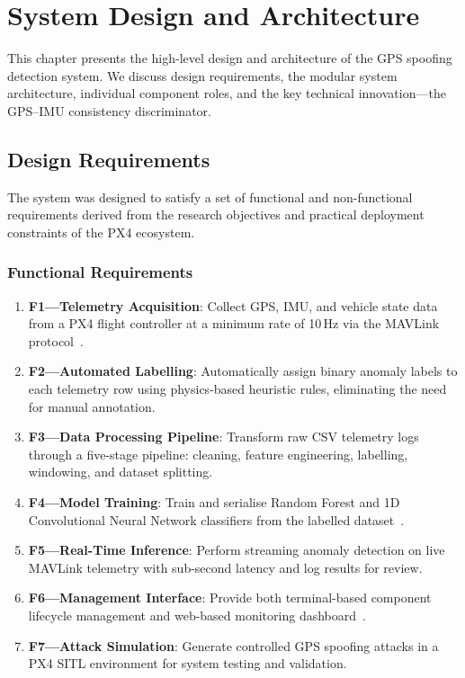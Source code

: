 \chapter{System Design and Architecture}

This chapter presents the high-level design and architecture of the GPS spoofing detection system. We discuss design requirements, the modular system architecture, individual component roles, and the key technical innovation---the GPS--IMU consistency discriminator.

\section{Design Requirements}

The system was designed to satisfy a set of functional and non-functional requirements derived from the research objectives and practical deployment constraints of the PX4 ecosystem.

\subsection{Functional Requirements}
\begin{enumerate}
    \item \textbf{F1---Telemetry Acquisition}: Collect GPS, IMU, and vehicle state data from a PX4 flight controller at a minimum rate of 10\,Hz via the MAVLink protocol~\cite{MAVLink}.
    \item \textbf{F2---Automated Labelling}: Automatically assign binary anomaly labels to each telemetry row using physics-based heuristic rules, eliminating the need for manual annotation.
    \item \textbf{F3---Data Processing Pipeline}: Transform raw CSV telemetry logs through a five-stage pipeline: cleaning, feature engineering, labelling, windowing, and dataset splitting.
    \item \textbf{F4---Model Training}: Train and serialise Random Forest and 1D Convolutional Neural Network classifiers from the labelled dataset~\cite{Pedregosa2011, Paszke2019}.
    \item \textbf{F5---Real-Time Inference}: Perform streaming anomaly detection on live MAVLink telemetry with sub-second latency and log results for review.
    \item \textbf{F6---Management Interface}: Provide both terminal-based component lifecycle management and web-based monitoring dashboard~\cite{StreamlitDocs}.
    \item \textbf{F7---Attack Simulation}: Generate controlled GPS spoofing attacks in a PX4 SITL environment for system testing and validation.
\end{enumerate}

